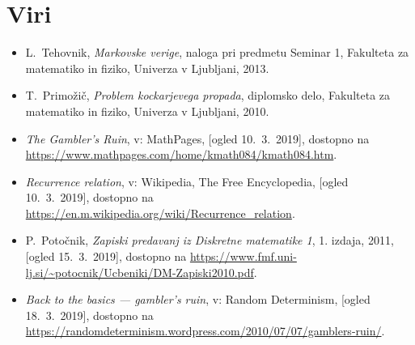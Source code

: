 \documentclass[12pt, a4paper]{article}
\begin{document}
\newpage

\section[Viri]{Viri}
\begin{itemize}
\item L.~Tehovnik, \emph{Markovske verige}, naloga pri predmetu Seminar 1, Fakulteta za matematiko in fiziko, Univerza v Ljubljani, 2013.
\item T.~Primožič, \emph{Problem kockarjevega propada}, diplomsko delo, Fakulteta za matematiko in fiziko, Univerza v Ljubljani, 2010.
\item \emph{The Gambler's Ruin}, v: MathPages, [ogled 10.~3.~2019], dostopno na \url{https://www.mathpages.com/home/kmath084/kmath084.htm}.
\item \emph{Recurrence relation}, v: Wikipedia, The Free Encyclopedia, [ogled 10.~3.~2019], dostopno na \url{https://en.m.wikipedia.org/wiki/Recurrence_relation}.
\item P.~Potočnik, \emph{Zapiski predavanj iz Diskretne matematike 1}, 1. izdaja, 2011, [ogled 15.~3.~2019], dostopno na \url{https://www.fmf.uni-lj.si/~potocnik/Ucbeniki/DM-Zapiski2010.pdf}.
\item \emph{Back to the basics — gambler’s ruin}, v: Random Determinism, [ogled 18.~3.~2019], dostopno na \url{https://randomdeterminism.wordpress.com/2010/07/07/gamblers-ruin/}.
\end{itemize}
\end{document}
